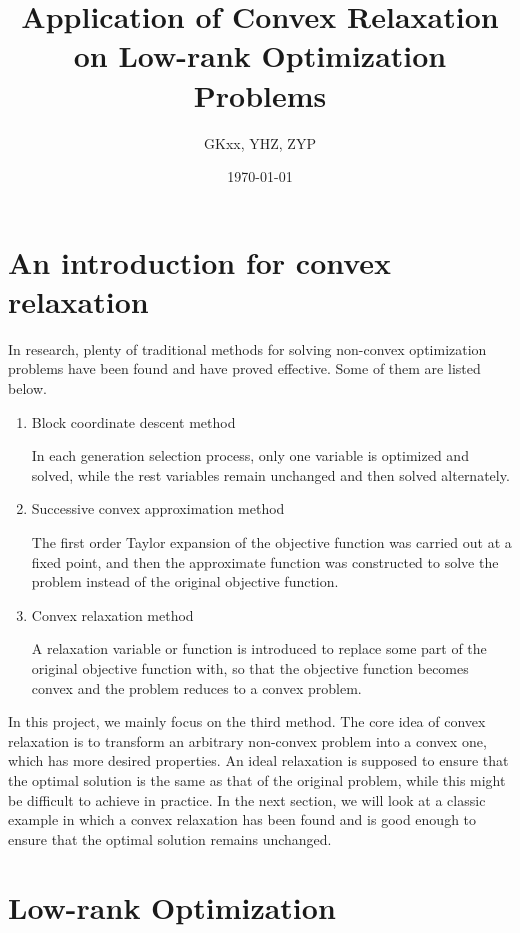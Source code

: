 \documentclass[11pt]{article}
\title{Application of Convex Relaxation on Low-rank Optimization Problems}
\author{GKxx, YHZ, ZYP}
\date{\today}
\begin{document}
\maketitle

\tableofcontents

\newpage

\section{An introduction for convex relaxation}

In research, plenty of traditional methods for solving non-convex optimization problems have been found and have proved effective. Some of them are listed below.

\begin{enumerate}
    \item Block coordinate descent method\par
    In each generation selection process, only one variable is optimized and solved, while the rest variables remain unchanged and then solved alternately.
    \item Successive convex approximation method\par
    The first order Taylor expansion of the objective function was carried out at a fixed point, and then the approximate function was constructed to solve the problem instead of the original objective function.
    \item Convex relaxation method\par
    A relaxation variable or function is introduced to replace some part of the original objective function with, so that the objective function becomes convex and the problem reduces to a convex problem.
\end{enumerate}

In this project, we mainly focus on the third method. The core idea of convex relaxation is to transform an arbitrary non-convex problem into a convex one, which has more desired properties. An ideal relaxation is supposed to ensure that the optimal solution is the same as that of the original problem, while this might be difficult to achieve in practice. In the next section, we will look at a classic example in which a convex relaxation has been found and is good enough to ensure that the optimal solution remains unchanged.

\section{Low-rank Optimization}
\end{document}
